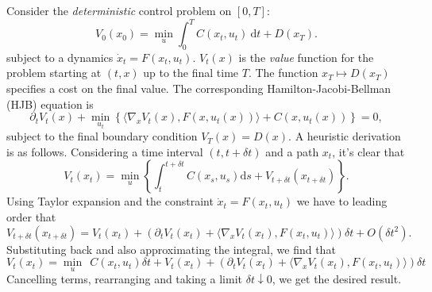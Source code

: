 \documentclass{article}
\newcommand{\diff}{\mathrm{d}}
\theoremstyle{newstyle}
\begin{document}
Consider the \emph{deterministic} control problem on $[0, T]$:
\begin{equation}
  V_0(x_0) = \min_{u} \int_0^T C(x_t, u_t) \: \diff t + D(x_T). 
\end{equation}
subject to a dynamics $\dot{x}_t = F(x_t, u_t)$. $V_t(x)$ is the \emph{value} function for the problem starting at $(t, x)$ up to the final time $T$. The function $x_T \mapsto D(x_T)$ specifies a cost on the final value. The corresponding Hamilton-Jacobi-Bellman (HJB) equation \cite[Section 3.11]{kirk2004optimal} is
\begin{equation}
  \partial_t V_t(x) + \min_{u_t} \left\{ \langle \nabla_x V_t(x), F(x, u_t(x)) \rangle + C(x, u_t(x)) \right\} = 0,
\end{equation}
subject to the final boundary condition $V_T(x) = D(x)$.
A heuristic derivation is as follows. Considering a time interval $(t, t + \delta t)$ and a path $x_t$, it's clear that
\begin{equation}
  V_t(x_t) = \min_{u} \left\{ \int_t^{t + \delta t} C(x_s, u_s) \diff s + V_{t + \delta t}(x_{t + \delta t}) \right\}.  
\end{equation}
Using Taylor expansion and the constraint $\dot{x}_t = F(x_t, u_t)$ we have to leading order that 
\begin{equation}
  V_{t + \delta t}(x_{t + \delta t}) = V_t(x_t) + \left( \partial_t V_t(x_t) + \langle \nabla_x V_t(x_t), F(x_t, u_t) \rangle \right) \delta t + O(\delta t^2). 
\end{equation}
Substituting back and also approximating the integral, we find that
\begin{equation}
  V_t(x_t) = \min_u \:\: C(x_t, u_t) \delta t + V_t(x_t) + \left( \partial_t V_t(x_t) + \langle \nabla_x V_t(x_t), F(x_t, u_t) \rangle \right) \delta t 
\end{equation}
Cancelling terms, rearranging and taking a limit $\delta t \downarrow 0$, we get the desired result.
\end{document}

